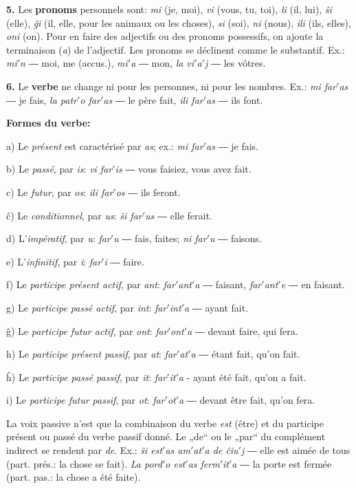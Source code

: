 \textbf{5.} Les \textbf{pronoms} personnels sont: \emph{mi} (je, moi), \emph{vi} (vous, tu, toi), \emph{li} (il, lui), \emph{ŝi} (elle), \emph{ĝi} (il, elle, pour les animaux ou les choses), \emph{si} (soi), \emph{ni} (nous), \emph{ili} (ils, elles), \emph{oni} (on). Pour en faire des adjectifs ou des pronoms possessifs, on ajoute la terminaison (\emph{a}) de l’adjectif. Les pronoms se déclinent comme le substantif. Ex.: \emph{mi$'$n} ― moi, me (accus.), \emph{mi$'$a} ― mon, \emph{la vi$'$a$'$j} ― les vôtres.

\textbf{6.} Le \textbf{verbe} ne change ni pour les personnes, ni pour les nombres. Ex.: \emph{mi far$'$as} ― je fais, \emph{la patr$'$o far$'$as} ― le père fait, \emph{ili far$'$as} ― ils font.

\begin{center}
\bf Formes du verbe:
\end{center}

a) Le \emph{présent} est caractérisé par \emph{as}; ex.: \emph{mi far$'$as} ― je fais.

b) Le \emph{passé}, par \emph{is}: \emph{vi far$'$is} ― vous faisiez, vous avez fait.

c) Le \emph{futur}, par \emph{os}: \emph{ili far$'$os} ― ils feront.

ĉ) Le \emph{conditionnel}, par \emph{us}: \emph{ŝi far$'$us} ― elle ferait.

d) L’\emph{impératif}, par \emph{u}: \emph{far$'$u} ― fais, faites; \emph{ni far$'$u} ― faisons.

e) L’\emph{infinitif}, par \emph{i}: \emph{far$'$i} ― faire.

f) Le \emph{participe présent actif}, par \emph{ant}: \emph{far$'$ant$'$a} ― faisant, \emph{far$'$ant$'$e} ― en faisant.

g) Le \emph{participe passé actif}, par \emph{int}: \emph{far$'$int$'$a} ― ayant fait.

ĝ) Le \emph{participe futur actif}, par \emph{ont}: \emph{far$'$ont$'$a} ― devant faire, qui fera.

h) Le \emph{participe présent passif}, par \emph{at}: \emph{far$'$at$'$a} ― étant fait, qu’on fait.

ĥ) Le \emph{participe passé passif}, par \emph{it}: \emph{far$'$it$'$a} - ayant été fait, qu’on a fait.

i) Le \emph{participe futur passif}, par \emph{ot}: \emph{far$'$ot$'$a} ― devant être fait, qu’on fera.

La voix passive n’est que la combinaison du verbe \emph{est} (être) et du participe présent ou passé du verbe passif donné. Le „de“ ou le „par“ du complément indirect se rendent par \emph{de}. Ex.: \emph{ŝi est$'$as am$'$at$'$a de ĉiu$'$j} ― elle est aimée de tous (part. prés.: la chose se fait). \emph{La pord$'$o est$'$as ferm$'$it$'$a} ― la porte est fermée (part. pas.: la chose a été faite).

